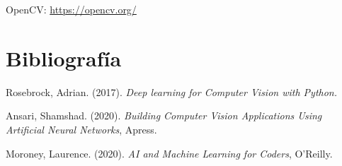 \documentclass[a4paper]{article}
\begin{document}
\newpage
\setcounter{secnumdepth}{0}
\doublespacing

\begin{thebibliography}{999}

 OpenCV: \url{https://opencv.org/}

\end{thebibliography}

\section{Bibliografía}

Rosebrock, Adrian. (2017). \textit{Deep learning for Computer Vision with Python.}

Ansari, Shamshad. (2020). \textit{Building Computer Vision Applications Using Artificial Neural Networks}, Apress.

Moroney, Laurence. (2020). \textit{AI and Machine Learning for Coders}, O'Reilly.
\end{document}
